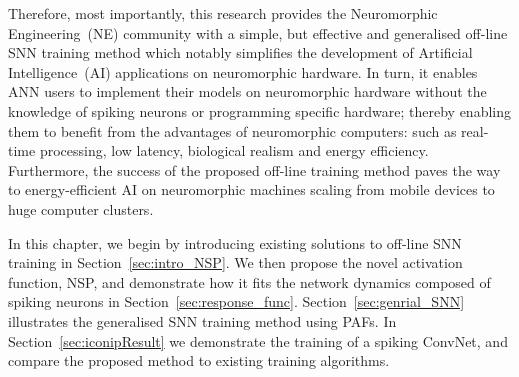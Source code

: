 Therefore, most importantly, this research provides the Neuromorphic Engineering~(NE) community with a simple, but effective and generalised off-line SNN training method which notably simplifies the development of Artificial Intelligence~(AI) applications on neuromorphic hardware.
In turn, it enables ANN users to implement their models on neuromorphic hardware without the knowledge of spiking neurons or programming specific hardware;
thereby enabling them to benefit from the advantages of neuromorphic computers: such as real-time processing, low latency, biological realism and energy efficiency.
Furthermore, the success of the proposed off-line training method paves the way to energy-efficient AI on neuromorphic machines scaling from mobile devices to huge computer clusters.



In this chapter, we begin by introducing existing solutions to off-line SNN training in Section~\ref{sec:intro_NSP}.
We then propose the novel activation function, NSP, and demonstrate how it fits the network dynamics composed of spiking neurons in Section~\ref{sec:response_func}.
Section~\ref{sec:genrial_SNN} illustrates the generalised SNN training method using PAFs.
In Section~\ref{sec:iconipResult} we demonstrate the training of a spiking ConvNet, and compare the proposed method to existing training algorithms.

\section{\DIFdelbegin {}\DIFdelend \DIFaddbegin {}\DIFaddend }
\DIFdelbegin %
\DIFdelend \DIFaddbegin \label{sec:NSP_relate}
\DIFaddend 

